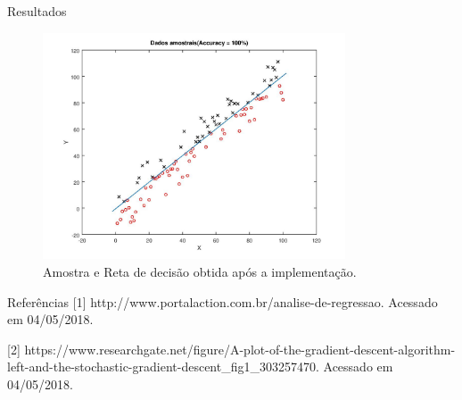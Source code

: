 \documentclass{beamer}
\begin{document}
  \begin{frame}{Resultados}
  \begin{figure}
  \centering
  \includegraphics[width=0.8\textwidth]{General.jpg}
  \caption{Amostra e Reta de decisão obtida após a implementação.}
  \end{figure}
  \end{frame}
  \begin{frame}{Referências}
   [1]	http://www.portalaction.com.br/analise-de-regressao. Acessado em 04/05/2018.
   
   [2] https://www.researchgate.net/figure/A-plot-of-the-gradient-descent-algorithm-left-and-the-stochastic-gradient-descent\_fig1\_303257470. Acessado em 04/05/2018.
  \end{frame}
\end{document}

